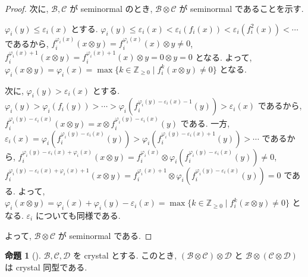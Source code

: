 \documentclass[
  a4paper, 
  12pt,
  ja=standard,
  xelatex,
  left=30truemm,
  right=30truemm,
  titlepage 
]{bxjsarticle}
\theoremstyle{definition}
\newtheorem{prop}[thm]{命題}
\begin{document}
\begin{proof}
  次に, $\mathcal{B}, \mathcal{C}$ が seminormal のとき, $\mathcal{B} \otimes \mathcal{C}$ が seminormal であることを示す.

  $\varphi_i(y) \leq \varepsilon_i(x)$ とする.
  $\varphi_i(y) \leq \varepsilon_i(x) < \varepsilon_i(f_i(x)) < \varepsilon_i(f_i^2(x)) < \cdots$ であるから,
  $f_i^{\varphi_i(x)} (x \otimes y) =f_i^{\varphi_i(x)}(x) \otimes y \neq 0$,
  $f_i^{\varphi_i(x) + 1 } (x \otimes y) =f_i^{\varphi_i(x) + 1 }(x) \otimes y = 0 \otimes y = 0$ となる. よって, 
  $\varphi_i(x \otimes y) = \varphi_i(x) = \max\{ k \in \mathbb{Z}_{\geq 0} \mid f_i^k( x \otimes y ) \neq 0 \}$ となる.

  次に, $\varphi_i(y) > \varepsilon_i(x)$ とする. $\varphi_i(y) > \varphi_i(f_i(y)) > \cdots > \varphi_i(f_i^{\varphi_i(y) - \varepsilon_i(x) - 1}(y)) > \varepsilon_i(x)$
  であるから, $f_i^{\varphi_i(y) - \varepsilon_i(x)}(x \otimes y) = x \otimes f_i^{\varphi_i(y) - \varepsilon_i(x)}(y)$ である.
  一方, $\varepsilon_i(x) = \varphi_i(f_i^{\varphi_i(y) - \varepsilon_i(x) }(y)) > \varphi_i(f_i^{\varphi_i(y) - \varepsilon_i(x) + 1 }(y)) > \cdots$
  であるから, $f_i^{\varphi_i(y) - \varepsilon_i(x) + \varphi_i(x)} ( x \otimes y ) = f_i^{\varphi_i(x)} \otimes \varphi_i(f_i^{\varphi_i(y) - \varepsilon_i(x) }(y)) \neq 0$,
  $f_i^{\varphi_i(y) - \varepsilon_i(x) + \varphi_i(x) + 1 } ( x \otimes y ) = f_i^{\varphi_i(x) + 1 } \otimes \varphi_i(f_i^{\varphi_i(y) - \varepsilon_i(x) }(y)) = 0$
  である. よって, $\varphi_i( x \otimes y ) = \varphi_i(x) + \varphi_i(y) - \varepsilon_i(x) = \max\{ k \in \mathbb{Z}_{\geq 0} \mid f_i^k(x \otimes y) \neq 0 \}$ となる.
  $\varepsilon_i$ についても同様である.

  よって, $\mathcal{B} \otimes \mathcal{C}$ が seminormal である.
\end{proof}

\begin{prop} [{\cite[命題2.32]{b1}}] 
  $\mathcal{B}, \mathcal{C}, \mathcal{D}$ を crystal とする.
  このとき, $(\mathcal{B} \otimes \mathcal{C}) \otimes \mathcal{D}$ と $\mathcal{B} \otimes (\mathcal{C} \otimes \mathcal{D})$ は crystal 同型である. 
\end{prop}
\end{document}
